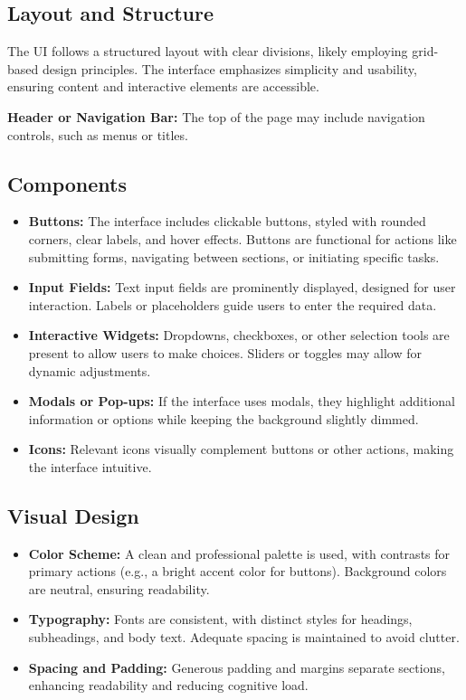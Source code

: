 \documentclass[12pt, titlepage]{article}
\begin{document}
\subsection*{Layout and Structure}
The UI follows a structured layout with clear divisions, likely employing grid-based design principles. The interface emphasizes simplicity and usability, ensuring content and interactive elements are accessible.  

\textbf{Header or Navigation Bar:} The top of the page may include navigation controls, such as menus or titles.  

\subsection*{Components}
\begin{itemize}
    \item \textbf{Buttons:} The interface includes clickable buttons, styled with rounded corners, clear labels, and hover effects. Buttons are functional for actions like submitting forms, navigating between sections, or initiating specific tasks.
    \item \textbf{Input Fields:} Text input fields are prominently displayed, designed for user interaction. Labels or placeholders guide users to enter the required data.
    \item \textbf{Interactive Widgets:} Dropdowns, checkboxes, or other selection tools are present to allow users to make choices. Sliders or toggles may allow for dynamic adjustments.
    \item \textbf{Modals or Pop-ups:} If the interface uses modals, they highlight additional information or options while keeping the background slightly dimmed.
    \item \textbf{Icons:} Relevant icons visually complement buttons or other actions, making the interface intuitive.
\end{itemize}  

\subsection*{Visual Design}
\begin{itemize}
    \item \textbf{Color Scheme:} A clean and professional palette is used, with contrasts for primary actions (e.g., a bright accent color for buttons). Background colors are neutral, ensuring readability.
    \item \textbf{Typography:} Fonts are consistent, with distinct styles for headings, subheadings, and body text. Adequate spacing is maintained to avoid clutter.
    \item \textbf{Spacing and Padding:} Generous padding and margins separate sections, enhancing readability and reducing cognitive load.
\end{itemize}  
\end{document}
